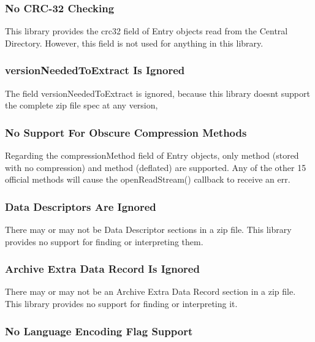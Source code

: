 \subsubsection*{No C\+R\+C-\/32 Checking}

This library provides the {\ttfamily crc32} field of {\ttfamily Entry} objects read from the Central Directory. However, this field is not used for anything in this library.

\subsubsection*{version\+Needed\+To\+Extract Is Ignored}

The field {\ttfamily version\+Needed\+To\+Extract} is ignored, because this library doesn\textquotesingle{}t support the complete zip file spec at any version,

\subsubsection*{No Support For Obscure Compression Methods}

Regarding the {\ttfamily compression\+Method} field of {\ttfamily Entry} objects, only method {} (stored with no compression) and method {} (deflated) are supported. Any of the other 15 official methods will cause the {\ttfamily open\+Read\+Stream()} {\ttfamily callback} to receive an {\ttfamily err}.

\subsubsection*{Data Descriptors Are Ignored}

There may or may not be Data Descriptor sections in a zip file. This library provides no support for finding or interpreting them.

\subsubsection*{Archive Extra Data Record Is Ignored}

There may or may not be an Archive Extra Data Record section in a zip file. This library provides no support for finding or interpreting it.

\subsubsection*{No Language Encoding Flag Support}

